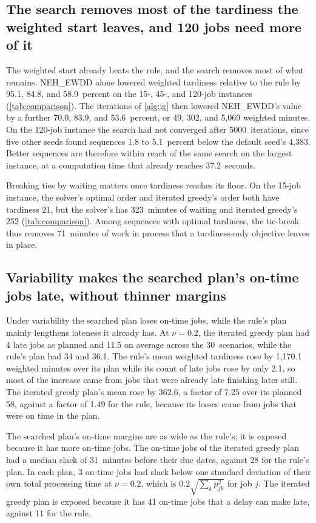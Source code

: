 \subsection{The search removes most of the tardiness the weighted start leaves, and 120 jobs need more of it}\label{sec:search}

\sumpara The weighted start already beats the rule, and the search removes most of what remains. \sumparaend
\fin NEH\_EWDD alone lowered weighted tardiness relative to the rule by 95.1, 84.8, and 58.9~percent on the 15-, 45-, and 120-job instances (\cref{tab:comparison}). \fine
\fin The iterations of \cref{alg:ig} then lowered NEH\_EWDD's value by a further 70.0, 83.9, and 53.6~percent, or 49, 302, and 5,069 weighted minutes. \fine
\fin On the 120-job instance the search had not converged after 5000~iterations, since five other seeds found sequences 1.8 to 5.1~percent below the default seed's 4,383. \fine
\fin Better sequences are therefore within reach of the same search on the largest instance, at a computation time that already reaches 37.2~seconds. \fine

\sumpara Breaking ties by waiting matters once tardiness reaches its floor. \sumparaend
\fin On the 15-job instance, the solver's optimal order and iterated greedy's order both have tardiness 21, but the solver's has 323~minutes of waiting and iterated greedy's 252 (\cref{tab:comparison}). \fine
\fin Among sequences with optimal tardiness, the tie-break thus removes 71~minutes of work in process that a tardiness-only objective leaves in place. \fine

\subsection{Variability makes the searched plan's on-time jobs late, without thinner margins}\label{sec:mechanism}

\sumpara Under variability the searched plan loses on-time jobs, while the rule's plan mainly lengthens lateness it already has. \sumparaend
\fin At $\nu = 0.2$, the iterated greedy plan had 4 late jobs as planned and 11.5 on average across the 30~scenarios, while the rule's plan had 34 and 36.1. \fine
\fin The rule's mean weighted tardiness rose by 1,170.1 weighted minutes over its plan while its count of late jobs rose by only 2.1, so most of the increase came from jobs that were already late finishing later still. \fine
\fin The iterated greedy plan's mean rose by 362.6, a factor of 7.25 over its planned 58, against a factor of 1.49 for the rule, because its losses come from jobs that were on time in the plan. \fine

\sumpara The searched plan's on-time margins are as wide as the rule's; it is exposed because it has more on-time jobs. \sumparaend
\fin The on-time jobs of the iterated greedy plan had a median slack of 31~minutes before their due dates, against 28 for the rule's plan. \fine
\fin In each plan, 3 on-time jobs had slack below one standard deviation of their own total processing time at $\nu = 0.2$, which is $0.2\sqrt{\sum_k p_{jk}^2}$ for job $j$. \fine
\fin The iterated greedy plan is exposed because it has 41 on-time jobs that a delay can make late, against 11 for the rule. \fine
